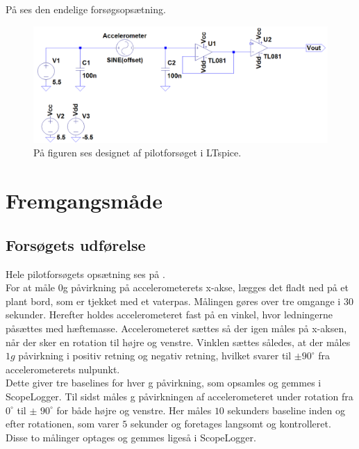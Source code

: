 \noindent På  ses den endelige forsøgsopsætning.
\begin{figure}[H]
	\centering
	\includegraphics[scale=0.4]{figures/Bilag/Acc_medbuffer.png}
	\caption{På figuren ses designet af pilotforsøget i LTspice.}
	\label{pforsoeg1}
\end{figure}

\section{Fremgangsmåde}
\subsection{Forsøgets udførelse}
Hele pilotforsøgets opsætning ses på . \\
For at måle $0$g påvirkning på accelerometerets x-akse, lægges det fladt ned på et plant bord, som er tjekket med et vaterpas. Målingen gøres over tre omgange i $30$ sekunder. Herefter holdes accelerometeret fast på en vinkel, hvor ledningerne påsættes med hæftemasse. Accelerometeret sættes så der igen måles på x-aksen, når der sker en rotation til højre og venstre. Vinklen sættes således, at der måles $1g$ påvirkning i positiv retning og negativ retning, hvilket svarer til $\pm90^{\circ}$ fra accelerometerets nulpunkt. \\
Dette giver tre baselines for hver g påvirkning, som opsamles og gemmes i ScopeLogger. %
Til sidst måles g påvirkningen af accelerometeret under rotation fra $0^{\circ}$ til $\pm$ $90^{\circ}$ for både højre og venstre. Her måles $10$ sekunders baseline inden og efter rotationen, som varer $5$ sekunder og foretages langsomt og kontrolleret. Disse to målinger optages og gemmes ligeså i ScopeLogger. \\
